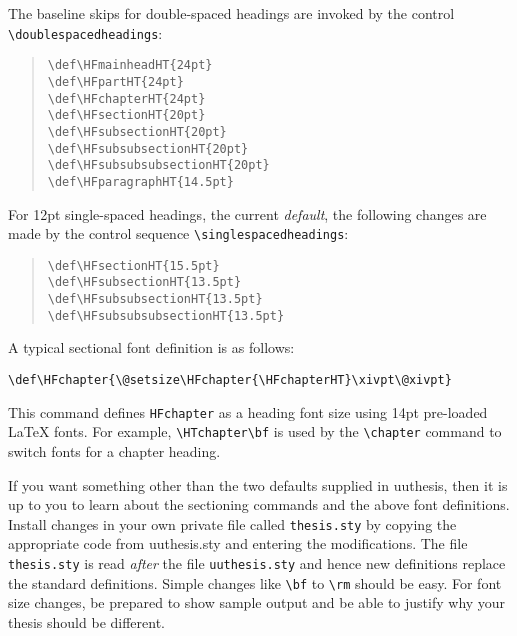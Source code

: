 The baseline skips for double-spaced headings are invoked by the control
\verb"\doublespacedheadings":

\begin{quote}
\verb"\def\HFmainheadHT{24pt}" \\
\verb"\def\HFpartHT{24pt}" \\
\verb"\def\HFchapterHT{24pt}" \\
\verb"\def\HFsectionHT{20pt}" \\
\verb"\def\HFsubsectionHT{20pt}" \\
\verb"\def\HFsubsubsectionHT{20pt}" \\
\verb"\def\HFsubsubsubsectionHT{20pt}" \\
\verb"\def\HFparagraphHT{14.5pt}"
\end{quote}

For 12pt single-spaced headings, the current {\em default}, the
following changes are made by the control sequence
\verb"\singlespacedheadings":

\begin{quote}
\verb"\def\HFsectionHT{15.5pt}" \\
\verb"\def\HFsubsectionHT{13.5pt}" \\
\verb"\def\HFsubsubsectionHT{13.5pt}" \\
\verb"\def\HFsubsubsubsectionHT{13.5pt}"
\end{quote}

A typical sectional font definition is as follows:

\verb"\def\HFchapter{\@setsize\HFchapter{\HFchapterHT}\xivpt\@xivpt}"

This command defines {\tt HFchapter} as a heading font size using 14pt
pre-loaded \LaTeX{} fonts. For example, \verb"\HTchapter\bf" is used by
the \verb"\chapter" command to switch fonts for a chapter heading.

If you want something other than the two defaults supplied in uuthesis,
then it is up to you to learn about the sectioning commands and the
above font definitions. Install changes in your own private file called
{\tt thesis.sty} by copying the appropriate code from uuthesis.sty and
entering the modifications. The file {\tt thesis.sty} is read {\em
after} the file {\tt uuthesis.sty} and hence new definitions replace the
standard definitions. Simple changes like \verb"\bf" to \verb"\rm"
should be easy. For font size changes, be prepared to show sample output
and be able to justify why your thesis should be different.


